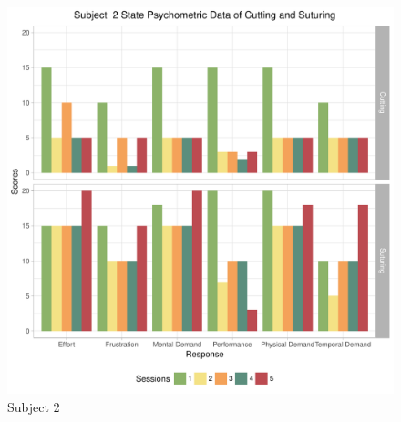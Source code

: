 \documentclass[12pt,epsf]{report}
\begin{document}
\begin{figure}[!htb]
\begin{minipage}[c]{0.5\linewidth}
	\includegraphics[width=\linewidth]{subject02_State_Psychometric_Data_of_Cutting_and_Suturing.pdf}
	\caption{Subject 2}
	\end{minipage}
\end{figure}
\end{document}
